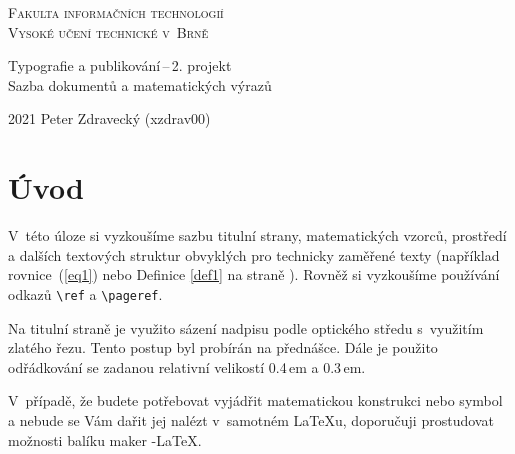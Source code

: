\documentclass[11pt,twocolumn,a4paper]{article}
\theoremstyle{definition}
\begin{document}
\begin{titlepage}

\begin{center}
    {\Huge{\textsc{Fakulta informačních technologií}}\\}
    {\Huge{\textsc{Vysoké učení technické v~Brně}}\\}
    
    {\LARGE{Typografie a publikování\,--\,2. projekt \\ Sazba dokumentů a matematických výrazů}\\}

\end{center}
{\Large {2021 \hfill Peter Zdravecký (xzdrav00)}}

\date{}

\end{titlepage}

\section*{Úvod}
V~této úloze si vyzkoušíme sazbu titulní strany, matematických vzorců, prostředí a dalších textových struktur obvyklých pro technicky zaměřené texty (například rovnice~(\ref{eq1}) nebo Definice \ref{def1} na straně \pageref{def1}). 
Rovněž si vyzkoušíme používání odkazů \verb|\ref| a \verb|\pageref|.

Na titulní straně je využito sázení nadpisu podle optického středu s~využitím zlatého řezu. Tento postup byl probírán na přednášce. Dále je použito odřádkování se zadanou relativní velikostí 0.4\,em a 0.3\,em.

V~případě, že budete potřebovat vyjádřit matematickou konstrukci nebo symbol a nebude se Vám dařit jej nalézt v~samotném \LaTeX u, doporučuji prostudovat možnosti balíku maker \AmS-\LaTeX.
\end{document}
